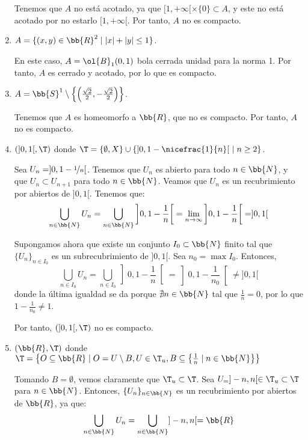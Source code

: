 \begin{ejercicio}
\begin{enumerate}
    Tenemos que $A$ no está acotado, ya que $[1,+\infty[\times \{0\} \subset A$,
    y este no está acotado por no estarlo $[1,+\infty[$. Por tanto, $A$ no es compacto.

    \item $A=\{(x, y) \in \bb{R}^2 \mid |x| + |y| \leq 1\}$.
    
    En este caso, $A=\ol{B}_1(0,1)$ bola cerrada unidad para la norma 1.
    Por tanto, $A$ es cerrado y acotado, por lo que es compacto.

    \item $A=\bb{S}^1 \setminus \left\{\left(\frac{\sqrt{2}}{2}, -\frac{\sqrt{2}}{2}\right)\right\}$.
    
    Tenemos que $A$ es homeomorfo a $\bb{R}$, que no es compacto. Por tanto, $A$ no es compacto.

    \item $(]0, 1[, \T) $ donde $ \T = \{\emptyset, X\} \cup \{]0, 1 - \nicefrac{1}{n}[~\mid n \geq 2\}$.
    
    Sea $U_n=]0, 1 - \nicefrac{1}{n}[$. Tenemos que $U_n$ es abierto para todo $n\in \bb{N}$, y que $U_n\subset U_{n+1}$ para todo $n\in \bb{N}$.
    Veamos que $U_n$ es un recubrimiento por abiertos de $]0,1[$. Tenemos que:
    \begin{equation*}
        \bigcup_{n\in \bb{N}} U_n = \bigcup_{n\in \bb{N}} \left]0, 1 - \frac{1}{n}\right[
            = \lim_{n\to \infty} \left]0, 1 - \frac{1}{n}\right[ = ]0,1[
    \end{equation*}

    Supongamos ahora que existe un conjunto $I_0\subset \bb{N}$ finito tal que $\{U_n\}_{n\in I_0}$ es un subrecubrimiento de $]0,1[$.
    Sea $n_0=\max I_0$. Entonces,
    \begin{equation*}
        \bigcup_{n\in I_0} U_n = \bigcup_{n\in I_0} \left]0, 1 - \frac{1}{n}\right[ = \left]0, 1 - \frac{1}{n_0}\right[ \neq ]0,1[
    \end{equation*}
    donde la última igualdad se da porque $\nexists n\in \bb{N}$ tal que $\frac{1}{n}=0$, por lo que $1-\frac{1}{n_0}\neq 1$.

    Por tanto, $(]0,1[, \T)$ no es compacto.
    
    \item $(\bb{R}, \T) $ donde $ \T = \left\{O \subseteq \bb{R} \mid O = U \setminus B, U \in \T_u, B \subseteq \left\{\frac{1}{n} \mid n \in \bb{N}\right\}\right\}$
    
    Tomando $B=\emptyset$, vemos claramente que $\T_u\subset \T$. Sea $U_=]-n,n[\in \T_u\subset \T$ para $n\in \bb{N}$. Entonces, $\{U_n\}_{n\in \bb{N}}$ es un
    recubrimiento por abiertos de $\bb{R}$, ya que:
    \begin{equation*}
        \bigcup_{n\in \bb{N}} U_n = \bigcup_{n\in \bb{N}} ]-n,n[ = \bb{R}
    \end{equation*}


\end{enumerate}
\end{ejercicio}
